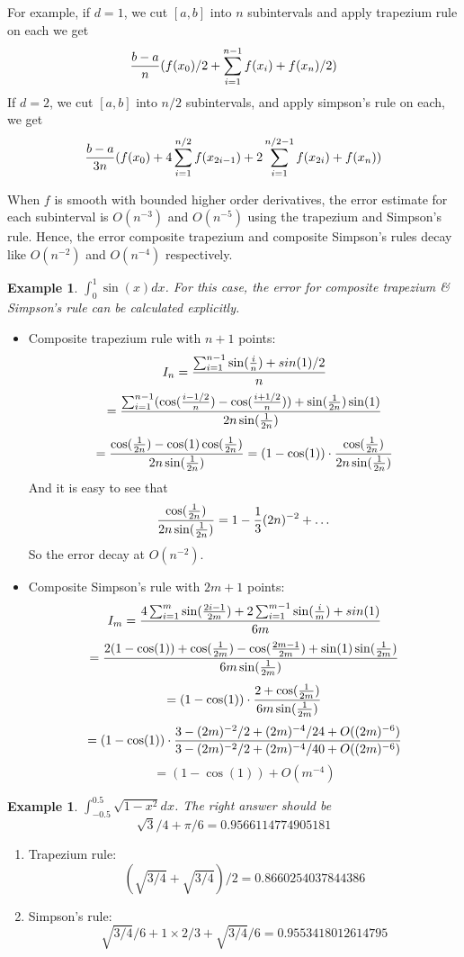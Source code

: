 \documentclass{article} %
\theoremstyle{break}
\newtheorem{exa}[definition]{Example}
\begin{document}
For example, if $d=1$, we cut $[a, b]$ into $n$ subintervals and apply trapezium rule on each we get
\[{b-a\over n}(f(x_0)/2+\sum_{i=1}^{n-1}f(x_i)+f(x_n)/2)\]
If $d=2$, we cut $[a, b]$ into $n/2$ subintervals, and apply simpson's rule on each, we get
\[{b-a\over 3n}(f(x_0)+4\sum_{i=1}^{n/2}f(x_{2i-1})+2\sum_{i=1}^{n/2-1}f(x_{2i})+f(x_n))\]



When $f$ is smooth with bounded higher order derivatives, the error estimate for each subinterval is $O(n^{-3})$ and $O(n^{-5})$ using the trapezium and Simpson's rule. Hence, the error composite trapezium and composite Simpson's rules decay like $O(n^{-2})$ and $O(n^{-4})$ respectively.


\begin{exa} $\int_0^1\sin(x)dx$. For this case, the error for composite trapezium \& Simpson's rule can be calculated explicitly. \end{exa}

\begin{itemize}
\item Composite trapezium rule with $n+1$ points:
  \[I_n={\sum_{i=1}^{n-1}\sin({i\over n})+sin(1)/2\over n}\]
  \[={\sum_{i=1}^{n-1}(\cos({i-1/2\over n})-\cos({i+1/2\over n}))+\sin({1\over 2n})\sin(1)\over 2n\sin({1\over 2n})}\]
  \[={\cos({1\over 2n})-\cos(1)\cos({1\over 2n})\over 2n\sin({1\over 2n})}=(1-\cos(1))\cdot{\cos({1\over 2n})\over 2n\sin({1\over 2n})}\]
  And it is easy to see that
  \[{\cos({1\over 2n})\over 2n\sin({1\over 2n})}=1-{1\over 3}(2n)^{-2}+\dots\]
  So the error decay at $O(n^{-2})$.


\item Composite Simpson's rule with $2m+1$ points:
  \[I_m={4\sum_{i=1}^{m}\sin({2i-1\over 2m})+2\sum_{i=1}^{m-1}\sin({i\over m})+sin(1)\over 6m}\]
  \[={2(1-\cos(1))+\cos({1\over 2m})-\cos({2m-1\over 2m})+\sin(1)\sin({1\over 2m})\over 6m\sin({1\over 2m})}\]
  \[=(1-\cos(1))\cdot{2+\cos({1\over 2m})\over 6m\sin({1\over 2m})}\]
  \[=(1-\cos(1))\cdot{3-(2m)^{-2}/2+(2m)^{-4}/24+O((2m)^{-6})\over 3-(2m)^{-2}/2+(2m)^{-4}/40+O((2m)^{-6})}\]
  \[=(1-\cos(1))+O(m^{-4})\]
\end{itemize}


\begin{exa}$\int_{-0.5}^{0.5}\sqrt{1-x^2}dx$. The right answer should be
  \[\sqrt{3}/4+\pi/6=0.9566114774905181\]
\end{exa}

\begin{enumerate}
  \item Trapezium rule:
    \[(\sqrt{3/4}+\sqrt{3/4})/2=0.8660254037844386\]
  \item Simpson's rule:
    \[\sqrt{3/4}/6+1\times 2/3+\sqrt{3/4}/6=0.9553418012614795\]
  \end{enumerate}
\end{document}
